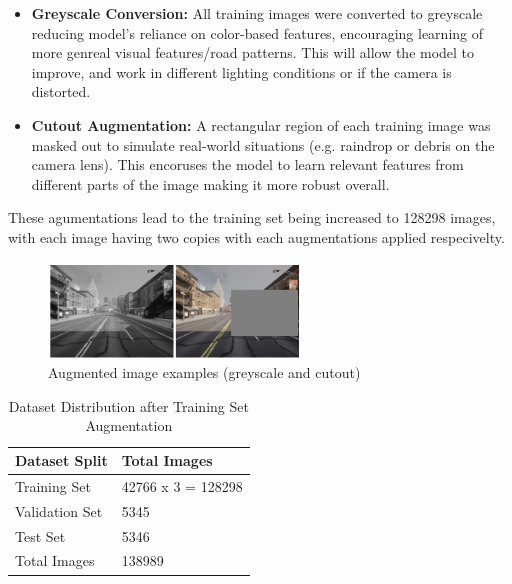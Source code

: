 \documentclass{article} %
\begin{document}
\begin{itemize}
  \item \textbf{Greyscale Conversion:} All training images were converted to greyscale reducing model's reliance on color-based features, encouraging learning of more genreal visual features/road patterns. This will allow the model to improve, and work in different lighting conditions or if the camera is distorted.

  \item \textbf{Cutout Augmentation:} A rectangular region of each training image was masked out to simulate real-world situations (e.g. raindrop or debris on the camera lens). This encoruses the model to learn relevant features from different parts of the image making it more robust overall. 
\end{itemize}

These agumentations lead to the training set being increased to 128298 images, with each image having two copies with each augmentations applied respecivelty.

\begin{figure}[H] %
    \centering
    \includegraphics[width=0.6\textwidth]{exampleofaugmented.png} %
    \caption{Augmented image examples (greyscale and cutout)}
    \label{fig:example}
\end{figure}


\begin{table}[h]
\centering
\caption{Dataset Distribution after Training Set Augmentation}
\vspace{0.5em}
\begin{tabular}{|p{2cm}|p{2cm}|}
\hline
\textbf{Dataset Split} & \textbf{Total Images} \\ \hline
Training Set           & 42766 x 3 =  128298\\ \hline
Validation Set         & 5345 \\ \hline
Test Set               & 5346 \\ \hline
Total Images           & 138989 \\ \hline
\end{tabular}
\end{table}
\end{document}
